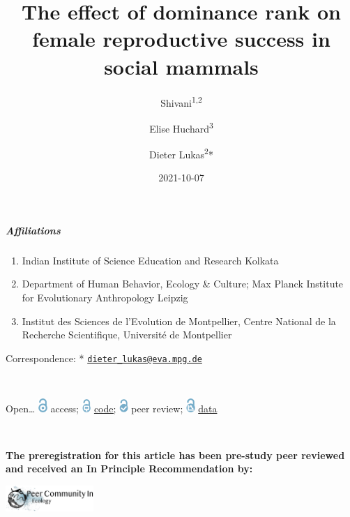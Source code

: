 \documentclass[
]{article}
\title{The effect of dominance rank on female reproductive success in
social mammals}
\author{Shivani\textsuperscript{1,2} \and Elise
Huchard\textsuperscript{3} \and Dieter Lukas\textsuperscript{2}*}
\date{2021-10-07}
\providecommand{\tightlist}{%
  \setlength{\itemsep}{0pt}\setlength{\parskip}{0pt}}
\begin{document}
\maketitle

\hypertarget{affiliations}{%
\subparagraph{Affiliations}\label{affiliations}}

\begin{enumerate}
\def\labelenumi{\arabic{enumi}.}
\tightlist
\item
  Indian Institute of Science Education and Research Kolkata
\item
  Department of Human Behavior, Ecology \& Culture; Max Planck Institute
  for Evolutionary Anthropology Leipzig
\item
  Institut des Sciences de l'Evolution de Montpellier, Centre National
  de la Recherche Scientifique, Université de Montpellier
\end{enumerate}

Correspondence: *
\href{mailto:dieter_lukas@eva.mpg.de}{\nolinkurl{dieter\_lukas@eva.mpg.de}}

~ ~ ~

Open\ldots{}
\includegraphics[width=0.025\textwidth,height=\textheight]{logoOpenAccess.png}
access;
\includegraphics[width=0.025\textwidth,height=\textheight]{logoOpenCode.png}
\href{https://github.com/corinalogan/grackles/blob/master/Files/Preregistrations/gdispersal_manuscript.Rmd}{code;}
\includegraphics[width=0.025\textwidth,height=\textheight]{logoOpenPeerReview.png}
peer review;
\includegraphics[width=0.025\textwidth,height=\textheight]{logoOpenData.png}
\href{https://doi.org/10.5063/F1W66J48}{data} ~ ~ ~\\
\hspace*{0.333em}

~

\textbf{The preregistration for this article has been pre-study peer
reviewed and received an In Principle Recommendation by:}

\includegraphics[width=0.25\textwidth,height=\textheight]{logoPCIecology.png}\\
\end{document}
